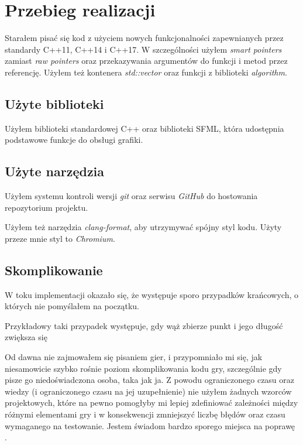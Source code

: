 \documentclass[12pt]{article}
\begin{document}
\section{Przebieg realizacji}


Starałem pisać się kod z użyciem nowych funkcjonalności zapewnianych przez
standardy C++11, C++14 i C++17. W szczególności użyłem \textit{smart pointers}
zamiast \textit{raw pointers} oraz przekazywania argumentów do funkcji i metod
przez referencję. Użyłem też kontenera \textit{std::vector} oraz funkcji z
biblioteki \textit{algorithm}.

\subsection{Użyte biblioteki}

Użyłem biblioteki standardowej C++ oraz biblioteki SFML, która udostępnia
podstawowe funkcje do obsługi grafiki.

\subsection{Użyte narzędzia}

Użyłem systemu kontroli wersji \textit{git} oraz serwisu \textit{GitHub} do
hostowania repozytorium projektu.

Użyłem też narzędzia \textit{clang-format}, aby utrzymywać spójny styl kodu.
Użyty przeze mnie styl to \textit{Chromium}.

\subsection{Skomplikowanie}
W toku implementacji okazało się, że występuje sporo przypadków krańcowych, o
których nie pomyślałem na początku.

Przykładowy taki przypadek występuje, gdy wąż zbierze punkt i jego długość
zwiększa się

Od dawna nie zajmowałem się pisaniem gier, i przypomniało mi się, jak
niesamowicie szybko rośnie poziom skomplikowania kodu gry, szczególnie gdy pisze
go niedoświadczona osoba, taka jak ja. Z powodu ograniczonego czasu oraz wiedzy
(i ograniczonego czasu na jej uzupełnienie) nie użyłem żadnych wzorców
projektowych, które na pewno pomogłyby mi lepiej zdefiniować zależności między
różnymi elementami gry i w konsekwencji zmniejszyć liczbę błędów oraz czasu
wymaganego na testowanie. Jestem świadom bardzo sporego miejsca na poprawę .
\end{document}
